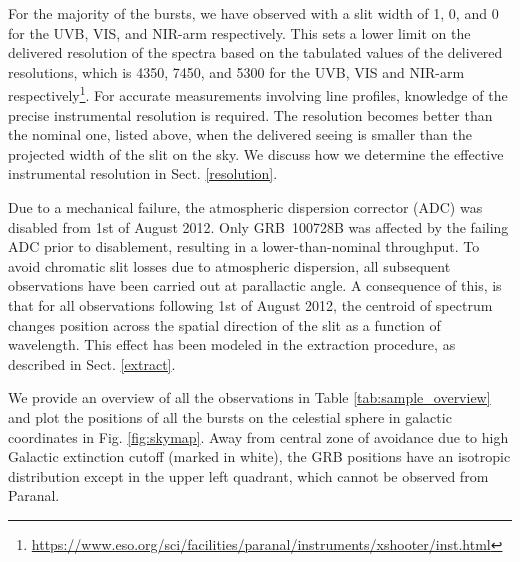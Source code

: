 \documentclass{aa}    %
\begin{document}
For the majority of the bursts, we have observed with a slit width of 1,
0, and 0 for the UVB, VIS, and NIR-arm respectively. This sets a
lower limit on the delivered resolution of the spectra based on the tabulated
values of the delivered resolutions, which is 4350, 7450, and 5300 for the UVB,
VIS and NIR-arm
respectively\footnote{\url{https://www.eso.org/sci/facilities/paranal/instruments/xshooter/inst.html}}. %
For accurate measurements involving line profiles, knowledge of the precise
instrumental resolution is required. The resolution becomes better than the
nominal one, listed above, when the delivered seeing is smaller than the
projected width of the slit on the sky. We discuss how we determine the
effective instrumental resolution in Sect. \ref{resolution}.

Due to a mechanical failure, the atmospheric dispersion corrector (ADC) was
disabled from 1st of August 2012. Only GRB~100728B was affected by the failing
ADC prior to disablement, resulting in a lower-than-nominal throughput. To avoid
chromatic slit losses due to atmospheric dispersion, all subsequent observations
have been carried out at parallactic angle. A consequence of this, is that for
all observations following 1st of August 2012, the centroid of spectrum changes
position across the spatial direction of the slit as a function of wavelength.
This effect has been modeled in the extraction procedure, as described in Sect. 
\ref{extract}.



We provide an overview of all the observations in Table
\ref{tab:sample_overview} and plot the positions of all the bursts on the
celestial sphere in galactic coordinates in Fig. \ref{fig:skymap}. Away from
central zone of avoidance due to high Galactic extinction cutoff (marked in
white), the GRB positions have an isotropic distribution except in the
upper left quadrant, which cannot be observed from Paranal.
\end{document}
